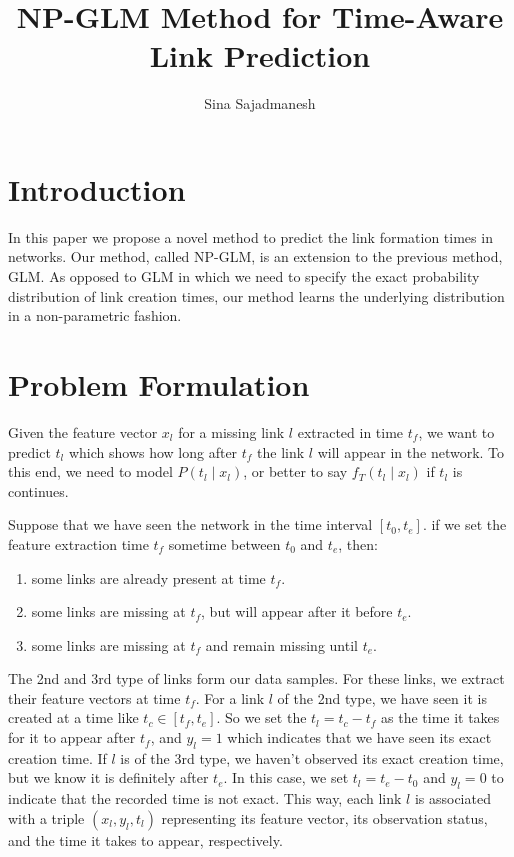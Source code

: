 \documentclass[]{article}
\title{NP-GLM Method for Time-Aware Link Prediction}
\author{Sina Sajadmanesh}
\begin{document}
\maketitle

\section{Introduction}
In this paper we propose a novel method to predict the link formation times in networks. Our method, called NP-GLM, is an extension to the previous method, GLM. As opposed to GLM in which we need to specify the exact probability distribution of link creation times, our method learns the underlying distribution in a non-parametric fashion.

\section{Problem Formulation}
Given the feature vector $x_l$ for a missing link $l$ extracted in time $t_f$, we want to predict $t_l$ which shows how long after $t_f$ the link $l$ will appear in the network. To this end, we need to model $P(t_l\mid x_l)$, or better to say $f_T(t_l\mid x_l)$ if $t_l$ is continues.

Suppose that we have seen the network in the time interval $[t_0,t_e]$. if we set the feature extraction time $t_f$ sometime between $t_0$ and $t_e$, then:

\begin{enumerate}
\item some links are already present at time $t_f$.
\item some links are missing at $t_f$, but will appear after it before $t_e$.
\item some links are missing at $t_f$ and remain missing until $t_e$. 
\end{enumerate}

The 2nd and 3rd type of links form our data samples. For these links, we extract their feature vectors at time $t_f$. For a link $l$ of the 2nd type, we have seen it is created at a time like $t_c\in[t_f,t_e]$. So we set the $t_l=t_c-t_f$ as the time it takes for it to appear after $t_f$, and $y_l=1$ which indicates that we have seen its exact creation time. If $l$ is of the 3rd type, we haven't observed its exact creation time, but we know it is definitely after $t_e$. In this case, we set $t_l=t_e-t_0$ and $y_l=0$ to indicate that the recorded time is not exact. This way, each link $l$ is associated with a triple $(x_l,y_l,t_l)$ representing its feature vector, its observation status, and the time it takes to appear, respectively.
\end{document}

